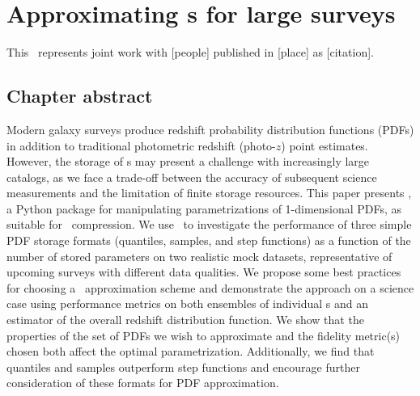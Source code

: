 \renewcommand{\chapid}{qp}

\newcommand{\thisplain}{qp}
\newcommand{\this}{\project{\thisplain}}
\newcommand{\mgdata}{bright\xspace}
\newcommand{\Mgdata}{Bright\xspace}
\newcommand{\ssdata}{faint\xspace}
\newcommand{\Ssdata}{Faint\xspace}

\newcommand*\patchAmsMathEnvironmentForLineno[1]{%
	\expandafter\let\csname old#1\expandafter\endcsname\csname #1\endcsname
	\expandafter\let\csname oldend#1\expandafter\endcsname\csname end#1\endcsname
	\renewenvironment{#1}%
	{\linenomath\csname old#1\endcsname}%
	{\csname oldend#1\endcsname\endlinenomath}}%
\newcommand*\patchBothAmsMathEnvironmentsForLineno[1]{%
	\patchAmsMathEnvironmentForLineno{#1}%
	\patchAmsMathEnvironmentForLineno{#1*}}%

\chapter{Approximating \pzpdf s for large surveys}

This \paper\ represents joint work with [people] published in [place] as [citation].

\section{Chapter abstract}

Modern galaxy surveys produce redshift probability distribution functions 
(PDFs) in addition to traditional photometric redshift (photo-$z$) point 
estimates.
However, the storage of \pz s may present a challenge with increasingly large 
catalogs, as we face a trade-off between the accuracy of subsequent science 
measurements and the limitation of finite storage resources.
This paper presents \qp, a Python package for manipulating parametrizations of 
1-dimensional PDFs, as suitable for \pz\ compression.
We use \qp\ to investigate the performance of three simple PDF storage formats 
(quantiles, samples, and step functions) as a function of the number of stored 
parameters on two realistic mock datasets, representative of upcoming surveys 
with different data qualities.
We propose some best practices for choosing a \pz\ approximation scheme and 
demonstrate the approach on a science case using performance metrics on both 
ensembles of individual \pz s and an estimator of the overall redshift 
distribution function.
We show that the properties of the set of PDFs we wish to approximate and the 
fidelity metric(s) chosen both affect the optimal parametrization.
Additionally, we find that quantiles and samples outperform step functions and 
encourage further consideration of these formats for PDF approximation.

